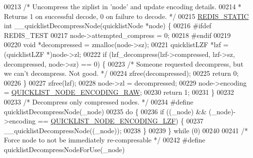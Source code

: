 \begin{DoxyCode}
{00213 \textcolor{comment}{/* Uncompress the ziplist in 'node' and update encoding details.}
00214 \textcolor{comment}{ * Returns 1 on successful decode, 0 on failure to decode. */}
00215 \hyperlink{quicklist_8c_a9c22c9c899458021930a552a4f94d317}{REDIS\_STATIC} \textcolor{keywordtype}{int} \_\_quicklistDecompressNode(quicklistNode *node) \{
00216 \textcolor{preprocessor}{#}\textcolor{preprocessor}{ifdef} \textcolor{preprocessor}{REDIS\_TEST}
00217     node->attempted\_compress = 0;
00218 \textcolor{preprocessor}{#}\textcolor{preprocessor}{endif}
00219 
00220     \textcolor{keywordtype}{void} *decompressed = zmalloc(node->sz);
00221     quicklistLZF *lzf = (quicklistLZF *)node->zl;
00222     \textcolor{keywordflow}{if} (lzf\_decompress(lzf->compressed, lzf->sz, decompressed, node->sz) == 0) \{
00223         \textcolor{comment}{/* Someone requested decompress, but we can't decompress.  Not good. */}
00224         zfree(decompressed);
00225         \textcolor{keywordflow}{return} 0;
00226     \}
00227     zfree(lzf);
00228     node->zl = decompressed;
00229     node->encoding = \hyperlink{quicklist_8h_a064c051a8fda9aa87dc3556b9cafc911}{QUICKLIST\_NODE\_ENCODING\_RAW};
00230     \textcolor{keywordflow}{return} 1;
00231 \}
00232 
00233 \textcolor{comment}{/* Decompress only compressed nodes. */}
00234 \textcolor{preprocessor}{#}\textcolor{preprocessor}{define} \textcolor{preprocessor}{quicklistDecompressNode}\textcolor{preprocessor}{(}\textcolor{preprocessor}{\_node}\textcolor{preprocessor}{)}
00235     \textcolor{keywordflow}{do} \textcolor{preprocessor}{\{}
00236         \textcolor{keywordflow}{if} \textcolor{preprocessor}{(}\textcolor{preprocessor}{(}\textcolor{preprocessor}{\_node}\textcolor{preprocessor}{)} \textcolor{preprocessor}{&&} \textcolor{preprocessor}{(}\textcolor{preprocessor}{\_node}\textcolor{preprocessor}{)}\textcolor{preprocessor}{->}\textcolor{preprocessor}{encoding} \textcolor{preprocessor}{==} \hyperlink{quicklist_8h_a6ce238912d4049e020b686def25c9566}{QUICKLIST\_NODE\_ENCODING\_LZF}\textcolor{preprocessor}{)} \textcolor{preprocessor}{\{}
00237             \textcolor{preprocessor}{\_\_quicklistDecompressNode}\textcolor{preprocessor}{(}\textcolor{preprocessor}{(}\textcolor{preprocessor}{\_node}\textcolor{preprocessor}{)}\textcolor{preprocessor}{)}\textcolor{preprocessor}{;}
00238         \textcolor{preprocessor}{\}}
00239     \textcolor{preprocessor}{\}} \textcolor{keywordflow}{while} \textcolor{preprocessor}{(}0\textcolor{preprocessor}{)}
00240 
00241 \textcolor{comment}{/* Force node to not be immediately re-compresable */}
00242 \textcolor{preprocessor}{#}\textcolor{preprocessor}{define} \textcolor{preprocessor}{quicklistDecompressNodeForUse}\textcolor{preprocessor}{(}\textcolor{preprocessor}{\_node}\textcolor{preprocessor}{)}
}
\end{DoxyCode}
